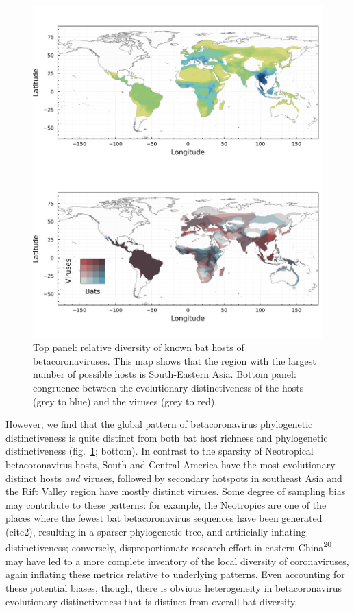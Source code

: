 \documentclass[11pt]{article}
\makeatletter
\def\maxwidth{\ifdim\Gin@nat@width>\linewidth\linewidth
\else\Gin@nat@width\fi}
\let\Oldincludegraphics\includegraphics
\renewcommand{\includegraphics}[1]{\Oldincludegraphics[width=\maxwidth]{#1}}
\makeatother
\begin{document}
\begin{figure}
\hypertarget{fig:richness}{%
\centering
\includegraphics{figures/combined_richness.png}
\caption{Top panel: relative diversity of known bat hosts of
betacoronaviruses. This map shows that the region with the largest
number of possible hosts is South-Eastern Asia. Bottom panel: congruence
between the evolutionary distinctiveness of the hosts (grey to blue) and
the viruses (grey to red).}\label{fig:richness}
}
\end{figure}

However, we find that the global pattern of betacoronavirus phylogenetic
distinctiveness is quite distinct from both bat host richness and
phylogenetic distinctiveness (fig.~\ref{fig:richness}; bottom). In
contrast to the sparsity of Neotropical betacoronavirus hosts, South and
Central America have the most evolutionary distinct hosts \emph{and}
viruses, followed by secondary hotspots in southeast Asia and the Rift
Valley region have mostly distinct viruses. Some degree of sampling bias
may contribute to these patterns: for example, the Neotropics are one of
the places where the fewest bat betacoronavirus sequences have been
generated (cite2), resulting in a sparser phylogenetic tree, and
artificially inflating distinctiveness; conversely, disproportionate
research effort in eastern China\textsuperscript{20} may have led to a
more complete inventory of the local diversity of coronaviruses, again
inflating these metrics relative to underlying patterns. Even accounting
for these potential biases, though, there is obvious heterogeneity in
betacoronavirus evolutionary distinctiveness that is distinct from
overall bat diversity.
\end{document}
